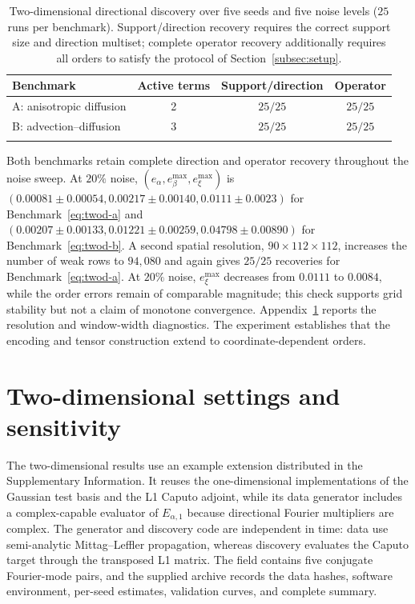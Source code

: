 \begin{table}[t]
\centering
\caption{Two-dimensional directional discovery over five seeds and five noise levels ($25$ runs per benchmark). Support/direction recovery requires the correct support size and direction multiset; complete operator recovery additionally requires all orders to satisfy the protocol of Section~\ref{subsec:setup}.}\label{tab:twod}
\footnotesize
\setlength{\tabcolsep}{5pt}
\begin{tabular*}{\textwidth}{@{\extracolsep\fill}lccc}
\toprule
Benchmark & Active terms & Support/direction & Operator \\
\midrule
A: anisotropic diffusion & 2 & $25/25$ & $25/25$ \\
B: advection--diffusion & 3 & $25/25$ & $25/25$ \\
\botrule
\end{tabular*}
\end{table}

Both benchmarks retain complete direction and operator recovery throughout the noise sweep. At $20\%$ noise, $(e_\alpha,e_\beta^{\max},e_\xi^{\max})$ is $(0.00081\pm0.00054,0.00217\pm0.00140,0.0111\pm0.0023)$ for Benchmark~\eqref{eq:twod-a} and $(0.00207\pm0.00133,0.01221\pm0.00259,0.04798\pm0.00890)$ for Benchmark~\eqref{eq:twod-b}. A second spatial resolution, $90\times112\times112$, increases the number of weak rows to $94{,}080$ and again gives $25/25$ recoveries for Benchmark~\eqref{eq:twod-a}. At $20\%$ noise, $e_\xi^{\max}$ decreases from $0.0111$ to $0.0084$, while the order errors remain of comparable magnitude; this check supports grid stability but not a claim of monotone convergence. Appendix~\ref{app:twod} reports the resolution and window-width diagnostics. The experiment establishes that the encoding and tensor construction extend to coordinate-dependent orders.

\FloatBarrier


\section{Two-dimensional settings and sensitivity}\label{app:twod}

The two-dimensional results use an example extension distributed in the Supplementary Information. It reuses the one-dimensional implementations of the Gaussian test basis and the L1 Caputo adjoint, while its data generator includes a complex-capable evaluator of $E_{\alpha,1}$ because directional Fourier multipliers are complex. The generator and discovery code are independent in time: data use semi-analytic Mittag--Leffler propagation, whereas discovery evaluates the Caputo target through the transposed L1 matrix. The field contains five conjugate Fourier-mode pairs, and the supplied archive records the data hashes, software environment, per-seed estimates, validation curves, and complete summary.

